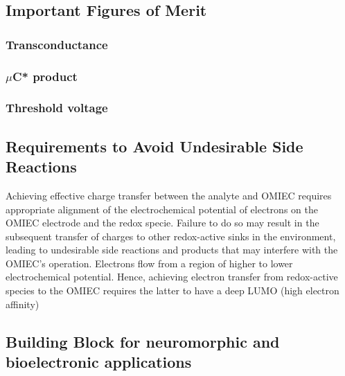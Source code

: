 \subsection{Important Figures of Merit}
\subsubsection{Transconductance}
\subsubsection{$\mu$C* product}
\subsubsection{Threshold voltage}

\subsection{Requirements to Avoid Undesirable Side Reactions}
Achieving effective charge transfer between the analyte and OMIEC requires appropriate alignment of the electrochemical potential of electrons on the OMIEC electrode and the redox specie. Failure to do so may result in the subsequent transfer of charges to other redox-active sinks in the environment, leading to undesirable side reactions and products that may interfere with the OMIEC’s operation. Electrons flow from a region of higher to lower electrochemical potential. Hence, achieving electron transfer from redox-active species to the OMIEC requires the latter to have a deep LUMO (high electron affinity) \cite{tan_tuning_2022}


\subsection{Building Block for neuromorphic and bioelectronic applications}

